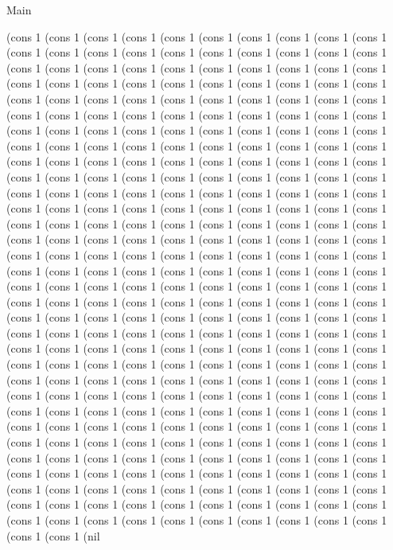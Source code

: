 \begin{lexlean}{Main}
\begin{semanticmodule}
(cons 1 (cons 1 (cons 1 (cons 1 (cons 1 (cons 1 (cons 1 (cons 1 (cons 1 (cons 1 (cons 1 (cons 1 (cons 1 (cons 1 (cons 1 (cons 1 (cons 1 (cons 1 (cons 1 (cons 1 (cons 1 (cons 1 (cons 1 (cons 1 (cons 1 (cons 1 (cons 1 (cons 1 (cons 1 (cons 1 (cons 1 (cons 1 (cons 1 (cons 1 (cons 1 (cons 1 (cons 1 (cons 1 (cons 1 (cons 1 (cons 1 (cons 1 (cons 1 (cons 1 (cons 1 (cons 1 (cons 1 (cons 1 (cons 1 (cons 1 (cons 1 (cons 1 (cons 1 (cons 1 (cons 1 (cons 1 (cons 1 (cons 1 (cons 1 (cons 1 (cons 1 (cons 1 (cons 1 (cons 1 (cons 1 (cons 1 (cons 1 (cons 1 (cons 1 (cons 1 (cons 1 (cons 1 (cons 1 (cons 1 (cons 1 (cons 1 (cons 1 (cons 1 (cons 1 (cons 1 (cons 1 (cons 1 (cons 1 (cons 1 (cons 1 (cons 1 (cons 1 (cons 1 (cons 1 (cons 1 (cons 1 (cons 1 (cons 1 (cons 1 (cons 1 (cons 1 (cons 1 (cons 1 (cons 1 (cons 1 (cons 1 (cons 1 (cons 1 (cons 1 (cons 1 (cons 1 (cons 1 (cons 1 (cons 1 (cons 1 (cons 1 (cons 1 (cons 1 (cons 1 (cons 1 (cons 1 (cons 1 (cons 1 (cons 1 (cons 1 (cons 1 (cons 1 (cons 1 (cons 1 (cons 1 (cons 1 (cons 1 (cons 1 (cons 1 (cons 1 (cons 1 (cons 1 (cons 1 (cons 1 (cons 1 (cons 1 (cons 1 (cons 1 (cons 1 (cons 1 (cons 1 (cons 1 (cons 1 (cons 1 (cons 1 (cons 1 (cons 1 (cons 1 (cons 1 (cons 1 (cons 1 (cons 1 (cons 1 (cons 1 (cons 1 (cons 1 (cons 1 (cons 1 (cons 1 (cons 1 (cons 1 (cons 1 (cons 1 (cons 1 (cons 1 (cons 1 (cons 1 (cons 1 (cons 1 (cons 1 (cons 1 (cons 1 (cons 1 (cons 1 (cons 1 (cons 1 (cons 1 (cons 1 (cons 1 (cons 1 (cons 1 (cons 1 (cons 1 (cons 1 (cons 1 (cons 1 (cons 1 (cons 1 (cons 1 (cons 1 (cons 1 (cons 1 (cons 1 (cons 1 (cons 1 (cons 1 (cons 1 (cons 1 (cons 1 (cons 1 (cons 1 (cons 1 (cons 1 (cons 1 (cons 1 (cons 1 (cons 1 (cons 1 (cons 1 (cons 1 (cons 1 (cons 1 (cons 1 (cons 1 (cons 1 (cons 1 (cons 1 (cons 1 (cons 1 (cons 1 (cons 1 (cons 1 (cons 1 (cons 1 (cons 1 (cons 1 (cons 1 (cons 1 (cons 1 (cons 1 (cons 1 (cons 1 (cons 1 (cons 1 (cons 1 (cons 1 (cons 1 (cons 1 (cons 1 (cons 1 (cons 1 (cons 1 (cons 1 (cons 1 (cons 1 (cons 1 (cons 1 (cons 1 (cons 1 (cons 1 (cons 1 (cons 1 (cons 1 (cons 1 (cons 1 (cons 1 (cons 1 (cons 1 (cons 1 (cons 1 (cons 1 (cons 1 (cons 1 (cons 1 (cons 1 (cons 1 (cons 1 (cons 1 (cons 1 (cons 1 (cons 1 (cons 1 (cons 1 (cons 1 (cons 1 (cons 1 (cons 1 (cons 1 (cons 1 (cons 1 (cons 1 (cons 1 (cons 1 (cons 1 (cons 1 (cons 1 (cons 1 (cons 1 (cons 1 (cons 1 (cons 1 (cons 1 (cons 1 (cons 1 (cons 1 (cons 1 (cons 1 (cons 1 (cons 1 (cons 1 (cons 1 (cons 1 (cons 1 (cons 1 (cons 1 (cons 1 (cons 1 (cons 1 (cons 1 (cons 1 (cons 1 (cons 1 (cons 1 (cons 1 (cons 1 (cons 1 (cons 1 (cons 1 (cons 1 (cons 1 (cons 1 (cons 1 (nil 
\end{semanticmodule}
\end{lexlean}
